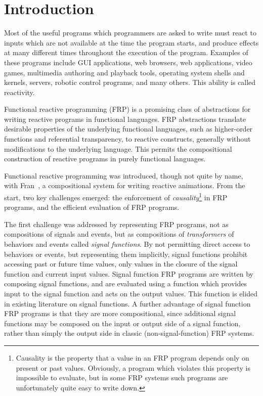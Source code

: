 \section{Introduction}
\label{section:Introduction}

Most of the useful programs which programmers are asked to write must react to inputs which are not available at the time the program starts,
and produce effects at many different times throughout the execution of the program. Examples of these programs include GUI applications,
web browsers, web applications, video games, multimedia authoring and playback tools, operating system shells and kernels, servers,
robotic control programs, and many others. This ability is called reactivity.

Functional reactive programming (FRP) is a promising class of abstractions for writing reactive programs in functional languages. FRP 
abstractions translate desirable properties of the underlying functional languages, such as higher-order functions and referential
transparency, to reactive constructs, generally without modifications to the underlying language. This permits the compositional
construction of reactive programs in purely functional languages.

Functional reactive programming was introduced, though not quite by name, with Fran~\cite{Elliott1997}, a compositional system for writing
reactive animations. From the start, two key challenges emerged: the enforcement of {\em causality}\footnote{Causality is the property 
that a value in an FRP program depends only on present or past values. Obviously, a program which violates this property is impossible to
evaluate, but in some FRP systems such programs are unfortunately quite easy to write down.} in FRP programs, and the efficient
evaluation of FRP programs.

The first challenge was addressed by representing FRP programs, not as compositions of signals and events, but as compositions of
{\em transformers} of behaviors and events called {\em signal functions}. By not permitting direct access to behaviors or events, but
representing them implicitly, signal functions prohibit accessing past or future time values, only values in the closure of the signal function
and current input values. Signal function FRP programs are written by composing signal functions, and are evaluated using a function which provides input to the
signal function and acts on the output values. This function is elided in existing literature on signal functions. 
A further advantage of signal function FRP programs is that they are more compositional, since additional signal functions may be composed
on the input or output side of a signal function, rather than simply the output side in classic (non-signal-function) FRP systems.

